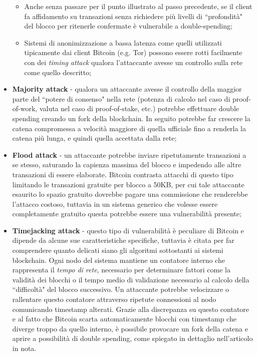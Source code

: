 \begin{itemize}
\begin{itemize}
					\item Anche senza passare per il punto illustrato al passo precedente, se il client fa affidamento su transazioni senza richiedere più livelli di ``profondità" del blocco per ritenerle confermate è vulnerabile a double-spending;
					\item Sistemi di anonimizzazione a bassa latenza come quelli utilizzati tipicamente dai client Bitcoin (e.g. Tor) possono essere rotti facilmente con dei \emph{timing attack} qualora l'attaccante avesse un controllo sulla rete come quello descritto;
				\end{itemize}
				\item \textbf{Majority attack} - qualora un attaccante avesse il controllo della maggior parte del ``potere di consenso" nella rete (potenza di calcolo nel caso di proof-of-work, valuta nel caso di proof-of-stake, etc.) potrebbe effettuare double spending creando un fork della blockchain. In seguito potrebbe far crescere la catena compromessa a velocità maggiore di quella ufficiale fino a renderla la catena più lunga, e quindi quella accettata dalla rete;
				\item \textbf{Flood attack} - un attaccante potrebbe inviare ripetutamente transazioni a se stesso, saturando la capienza massima del blocco e impedendo alle altre transazioni di essere elaborate. Bitcoin contrasta attacchi di questo tipo limitando le transazioni gratuite per blocco a 50KB, per cui tale attaccante esaurito lo spazio gratuito dovrebbe pagare una commissione che renderebbe l'attacco costoso, tuttavia in un sistema generico che volesse essere completamente gratuito questa potrebbe essere una vulnerabilità presente;
				\item \textbf{Timejacking attack}\cite{timejacking} - questo tipo di vulnerabilità è peculiare di Bitcoin e dipende da alcune sue caratteristiche specifiche, tuttavia è citata per far comprendere quanto delicati siano gli algoritmi sottostanti ai sistemi blockchain. Ogni nodo del sistema mantiene un contatore interno che rappresenta il \emph{tempo di rete}, necessario per determinare fattori come la validità dei blocchi o il tempo medio di validazione necessario al calcolo della ``difficoltà" del blocco successivo. Un attaccante potrebbe velocizzare o rallentare questo contatore attraverso ripetute connessioni al nodo comunicando timestamp alterati. Grazie alla discrepanza su questo contatore e al fatto che Bitcoin scarta automaticamente blocchi con timestamp che diverge troppo da quello interno, è possibile provocare un fork della catena e aprire a possibilità di double spending, come spiegato in dettaglio nell'articolo in nota.
			\end{itemize}
